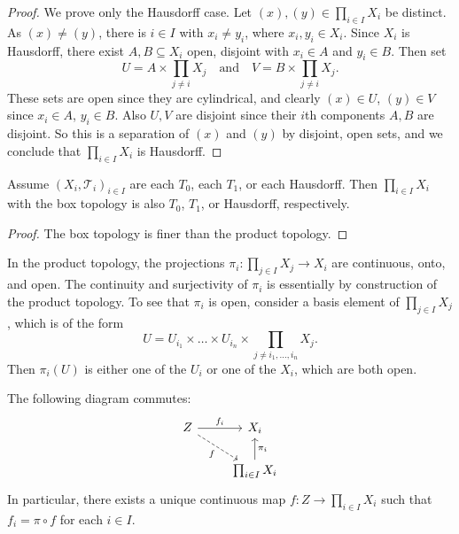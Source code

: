 \begin{proof}
  We prove only the Hausdorff case. Let
  $(x), (y) \in \prod_{i \in I} X_i$ be distinct.
  As $(x) \ne (y)$, there is $i \in I$
  with $x_i \ne y_i$, where $x_i, y_i \in X_i$.
  Since $X_i$ is Hausdorff, there exist
  $A, B \subseteq X_i$ open, disjoint
  with $x_i \in A$ and $y_i \in B$.
  Then set
  \[
    U = A \times \prod_{j \ne i} X_j \quad \text{and} \quad
    V = B \times \prod_{j \ne i} X_j.
  \]
  These sets are open since they are cylindrical,
  and clearly $(x) \in U$, $(y) \in V$ since
  $x_i \in A$, $y_i \in B$. Also $U, V$ are
  disjoint since their $i$th components $A, B$
  are disjoint. So this is a separation of
  $(x)$ and $(y)$ by disjoint, open sets, and
  we conclude that $\prod_{i \in I} X_i$ is Hausdorff.
\end{proof}

\begin{corollary}
  Assume $(X_i, \mathcal{T}_i)_{i \in I}$ are each
  $T_0$, each $T_1$, or each Hausdorff. Then
  $\prod_{i \in I} X_i$ with the
  box topology is also $T_0$, $T_1$,
  or Hausdorff, respectively.
\end{corollary}

\begin{proof}
  The box topology is finer than the product topology.
\end{proof}

\begin{remark}
  In the product topology, the
  projections $\pi_i : \prod_{j \in I} X_j \to X_i$
  are continuous, onto, and open.
  The continuity and surjectivity of $\pi_i$ is
  essentially by construction of the product topology.
  To see that $\pi_i$ is open, consider a basis
  element of $\prod_{j \in I} X_j$, which is of the form
  \[
    U = U_{i_1} \times \dots \times U_{i_n}
    \times \prod_{j \ne i_1, \dots, i_n} X_j.
  \]
  Then $\pi_i(U)$ is either one of the
  $U_{i}$ or one of the $X_i$, which are both open.
\end{remark}

\begin{theorem}
  The following diagram commutes:
  \[
    \begin{tikzcd}
      Z \ar[r, "f_i"] \ar[dr, "f", swap, dashed] & X_i \\
       & \prod_{i \in I} X_i \ar[u, "\pi_i"']
    \end{tikzcd}
  \]
  In particular, there exists a unique continuous
  map $f : Z \to \prod_{i \in I} X_i$ such that
  $f_i = \pi \circ f$ for each $i \in I$.
\end{theorem}

